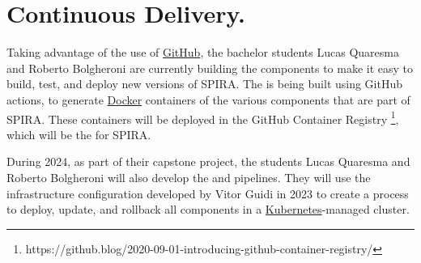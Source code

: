   \section{Continuous Delivery.}
  \label{sec:spira_continuous_delivery}
  Taking advantage of the use of \href{https://github.com}{GitHub},
  the bachelor students Lucas Quaresma and Roberto Bolgheroni are currently
  building the  components to make
  it easy to build, test, and deploy new versions of SPIRA.
  The  is being built using GitHub actions,
  to generate \href{https://www.docker.com/}{Docker} containers of the
  various components that are part of SPIRA. These containers will be
  deployed in the GitHub Container Registry%
  \footnote{https://github.blog/2020-09-01-introducing-github-container-registry/},
  which will be the  for SPIRA.
  
  During 2024, as part of their capstone project, the students
  Lucas Quaresma and Roberto Bolgheroni will also develop the
   and  pipelines.
  They will use the infrastructure configuration developed by Vitor Guidi
  in 2023 to create a process to deploy, update, and rollback all components
  in a \href{https://kubernetes.io/}{Kubernetes}-managed cluster.
